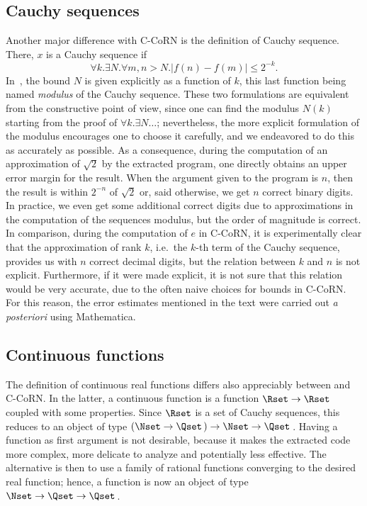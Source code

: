 \documentclass{entcs}
\begin{document}
\subsection{Cauchy sequences}
Another major difference with C-CoRN is the definition of Cauchy
sequence. There, $x$ is a Cauchy sequence if
\[\forall k.\exists N.\forall m,n>N.|f(n)-f(m)|\leq2^{-k}.\]
In~\cite{sch:03}, the bound $N$ is given
explicitly as a function of $k$, this last function being named {\it
modulus} of the Cauchy sequence.  These two formulations are
equivalent from the constructive point of view, since one can find the
modulus $N(k)$ starting from the proof of $\forall k.\exists
N\ldots$; nevertheless, the more explicit formulation of the modulus
encourages one to choose it carefully, and we endeavored to do this as
accurately as possible.  As a consequence, during the computation of
an approximation of $\sqrt{2}$ by the extracted program, one directly
obtains an upper error margin for the result. When the argument given to
the program is $n$, then the result is within 
$2^{-n}$ of $\sqrt{2}$ or, said otherwise, we get $n$ correct
binary digits.  In practice, we even get some additional correct
digits due to approximations in the computation of the sequences
modulus, but the order of magnitude is correct.  In comparison, during
the computation of $e$ in C-CoRN, it is
experimentally clear that the approximation of rank $k$, i.e.\ the
$k$-th term of the Cauchy sequence, provides us with $n$ correct
decimal digits, but the relation between $k$ and $n$ is not explicit.
Furthermore, if it were made explicit, it is not sure that this
relation would be very accurate, due to the often naive choices for
bounds in C-CoRN.  For this reason, the error estimates mentioned in
the text were carried out \emph{a posteriori} using Mathematica.

\subsection{Continuous functions}
The definition of continuous real functions differs also appreciably
between \cite{sch:03} and C-CoRN.  In the latter, a continuous
function is a function $\Rset\to\Rset$ coupled with some properties.
Since $\Rset$ is a set of Cauchy sequences, this reduces to an object
of type $(\Nset\to\Qset\,)\to\Nset\to\Qset\,$.
Having a function as first argument is not desirable,
because it makes the extracted code more complex, more delicate to
analyze and potentially less effective.  The alternative is then to
use a family of rational functions converging to the desired
real function; hence, a function is now an object of
type $\Nset\to\Qset\to\Qset\,$.
\end{document}
